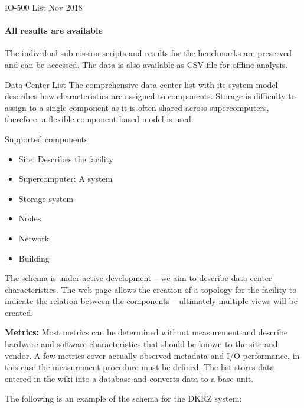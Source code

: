 \documentclass[portrait,a0paper,fontscale=0.4]{baposter}
\newcommand{\compresslist}{%
\setlength{\itemsep}{1pt}%
\setlength{\parskip}{0pt}%
\setlength{\parsep}{0pt}%
}
\begin{document}
\begin{poster}
\begin{posterbox}[name=io500res,column=1,above=bottom,below=io500]{IO-500 List Nov 2018}
\vspace*{-1em}

\paragraph{All results are available}

The individual submission scripts and results for the benchmarks are preserved and can be accessed.
The data is also available as CSV file for offline analysis.


\end{posterbox}



\begin{posterbox}[name=schedule,column=2,span=1, above=bottom, below=io500]{Data Center List}
The comprehensive data center list with its system model describes how characteristics are assigned to components.
Storage is difficulty to assign to a single component as it is often shared across supercomputers,
therefore, a flexible component based model is used.

Supported components:
\vspace*{-1em}
\begin{itemize}\compresslist
\item Site: Describes the facility
\item Supercomputer: A system
\item Storage system
\item Nodes
\item Network
\item Building
\end{itemize}

\vspace*{-1em}

The schema is under active development -- we aim to describe data center characteristics.
The web page allows the creation of a topology for the facility to indicate the relation between the components -- ultimately multiple views will be created.


\textbf{Metrics:} Most metrics can be determined without measurement and describe hardware and software characteristics that should be known to the site and vendor. A few metrics cover actually observed metadata and I/O performance, in this case the measurement procedure must be defined.
The list stores data entered in the wiki into a database and converts data to a base unit.

The following is an example of the schema for the DKRZ system:


\end{posterbox}
\end{poster}
\end{document}
